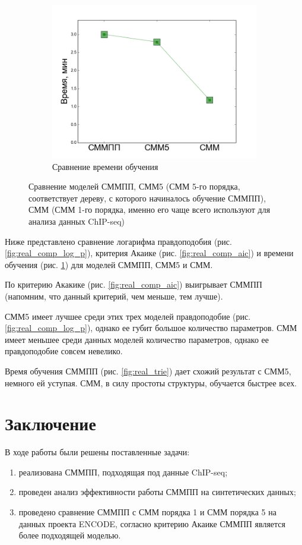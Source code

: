 \documentclass{matmex-diploma-custom}
\begin{document}
\begin{figure}[h!]
\begin{subfigure}[b]{0.32 \textwidth}
	\includegraphics[scale=0.28]{img/real/time.png}
	\centering
	\caption{ Сравнение времени обучения }
	\label{fig:real_comp_time}
\end{subfigure}
\caption{ Сравнение моделей СММПП, СММ5 (СММ 5-го порядка, соответствует дереву, с которого начиналось обучение СММПП), СММ (СММ 1-го порядка, именно его чаще всего используют для анализа данных ChIP-seq) }
\label{fig:real_comp}
\end{figure}

Ниже представлено сравнение логарифма правдоподобия (рис. \ref{fig:real_comp_log_p}), критерия Акаике (рис. \ref{fig:real_comp_aic}) и времени обучения (рис. \ref{fig:real_comp_time}) для моделей СММПП, СММ5 и СММ.

По критерию Акакике (рис. \ref{fig:real_comp_aic}) выигрывает СММПП (напомним, что данный критерий, чем меньше, тем лучше).

СММ5 имеет лучшее среди этих трех моделей правдоподобие (рис. \ref{fig:real_comp_log_p}), однако ее губит большое количество параметров. 
СММ имеет меньшее среди данных моделей количество параметров, однако ее правдоподобие совсем невелико.
 
Время обучения СММПП (рис. \ref{fig:real_trie}) дает схожий результат с СММ5, немного ей уступая. СММ, в силу простоты структуры, обучается быстрее всех.


\section*{Заключение}
В ходе работы были решены поставленные задачи:
\begin{enumerate}
\item
реализована СММПП, подходящая под данные ChIP-seq;
\item
проведен анализ эффективности работы СММПП на
синтетических данных; 
\item
проведено сравнение СММПП с СММ порядка 1 и СММ порядка 5 на данных проекта ENCODE, согласно критерию Акаике СММПП является более подходящей моделью.
\end{enumerate}



\end{document}
